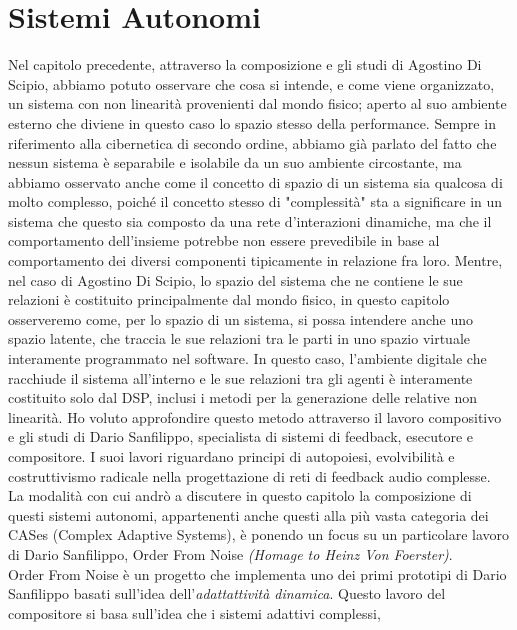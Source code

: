 \section{Sistemi Autonomi}
\label{sec:Sistemi Autonomi}

Nel capitolo precedente, attraverso la composizione e gli studi di Agostino Di Scipio, 
abbiamo potuto osservare che cosa si intende, e come viene organizzato, 
un sistema con non linearità provenienti dal mondo fisico; aperto al suo ambiente esterno 
che diviene in questo caso lo spazio stesso della performance.
Sempre in riferimento alla cibernetica di secondo ordine,
abbiamo già parlato del fatto che nessun sistema è separabile e 
isolabile da un suo ambiente circostante, 
ma abbiamo osservato anche come il concetto di spazio di un sistema sia 
qualcosa di molto complesso, poiché il concetto stesso di "complessità"
sta a significare in un sistema che questo sia composto da una rete d'interazioni dinamiche, 
ma che il comportamento dell'insieme potrebbe non essere prevedibile in base al comportamento 
dei diversi componenti tipicamente in relazione fra loro.
Mentre, nel caso di Agostino Di Scipio, lo spazio del sistema che ne contiene le sue relazioni 
è costituito principalmente dal mondo fisico, 
in questo capitolo osserveremo come, per lo spazio di un sistema, 
si possa intendere anche uno spazio latente, 
che traccia le sue relazioni tra le parti in uno spazio virtuale interamente programmato nel software. 
In questo caso, l'ambiente digitale che racchiude il sistema all'interno e le sue relazioni 
tra gli agenti è interamente costituito solo dal DSP, 
inclusi i metodi per la generazione delle relative non linearità.
Ho voluto approfondire questo metodo attraverso il lavoro compositivo e gli studi di Dario Sanfilippo, 
specialista di sistemi di feedback, esecutore e compositore. 
I suoi lavori riguardano principi di autopoiesi, evolvibilità e costruttivismo radicale nella progettazione 
di reti di feedback audio complesse. \\
La modalità con cui andrò a discutere in questo capitolo la composizione di questi
sistemi autonomi, appartenenti anche questi alla più vasta categoria dei CASes (Complex Adaptive Systems), 
è ponendo un focus su un particolare lavoro di Dario Sanfilippo, Order From Noise \textit{(Homage to Heinz Von Foerster)}. \\
Order From Noise è un progetto che implementa uno 
dei primi prototipi di Dario Sanfilippo basati sull'idea dell'\textit{adattattività dinamica}. 
Questo lavoro del compositore si basa sull'idea che i sistemi adattivi complessi, 
